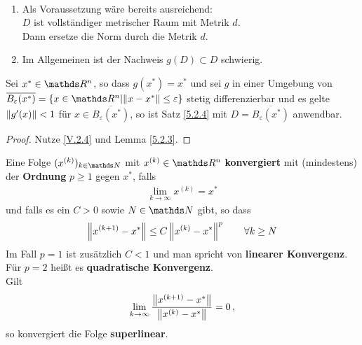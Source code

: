 \begin{Beme}
  \label{5.2.5}~
  \begin{enumerate}[1)]
  \item Als Voraussetzung wäre bereits ausreichend:\\
    $D$ ist vollständiger metrischer Raum mit Metrik $d$. \\
    Dann ersetze die Norm durch die Metrik $d$.
  \item Im Allgemeinen ist der Nachweis $g(D)\subset D$ schwierig.
  \end{enumerate}
\end{Beme}



\begin{Fole}
  \label{5.2.6}
  Sei $x^{*}\in \R^n$, so dass $g(x^{*})=x^{*}$ und sei $g$ in einer Umgebung von 
  $\overline{B_\varepsilon(x^{*})}=\left\{ x\in \R^n \middle\vert \nn{x-x^{*}}\leq \varepsilon \right\}$
  stetig differenzierbar und es gelte $\left\| g'(x) \right\|<1$ für $x\in \overline{B_\varepsilon(x^{*})}$,
  so ist Satz \ref{5.2.4} mit $D=\overline{B_\varepsilon(x^{*})}$ anwendbar.
\end{Fole}

\begin{proof}
  Nutze \eqref{V.2.4} und Lemma \ref{5.2.3}.
\end{proof}


\begin{Defe}
  \label{5.3.1}
  Eine Folge $(x^{(k)})_{k\in\N} $ mit $x^{(k)}\in\R^n$ \textbf{konvergiert} mit (mindestens)
  der \textbf{Ordnung} $p\geq 1$ gegen $x^{*}$, falls
  \begin{gather*}
    \lim\limits_{k\rightarrow \infty}x^{(k)}=x^{*}
  \end{gather*}
  und falls es ein $C>0$ sowie $N\in\N$ gibt, so dass
  \begin{gather*}
    \left\| x^{(k+1)}-x^{*} \right\| \leq C \left\| x^{(k)}-x^{*} \right\|^p\qquad \forall k\geq N 
  \end{gather*}
  Im Fall $p=1$ ist zusätzlich $C<1$ und man spricht von \textbf{linearer Konvergenz}. \\
  Für $p=2$ heißt es \textbf{quadratische Konvergenz}.
  \\Gilt 
  \begin{gather*} 
    \lim\limits_{k\rightarrow \infty}\frac{\left\| x^{(k+1)}-x^{*} \right\|}{\left\| x^{(k)}-x^{*} \right\|} = 0\, ,
  \end{gather*} so konvergiert die Folge \textbf{superlinear}.
\end{Defe}


